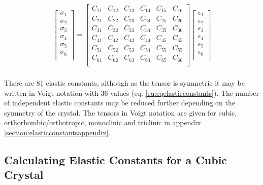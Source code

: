 \begin{equation}
  \begin{split}
    \begin{bmatrix}
      \sigma_{1} \\
      \sigma_{2} \\
      \sigma_{3} \\
      \sigma_{4} \\
      \sigma_{5} \\
      \sigma_{6} \\
      \end{bmatrix} = \begin{bmatrix}
      C_{11} & C_{12} & C_{13} & C_{14} & C_{15} & C_{16} \\
      C_{21} & C_{22} & C_{23} & C_{24} & C_{25} & C_{26} \\
      C_{31} & C_{32} & C_{33} & C_{34} & C_{35} & C_{36} \\
      C_{41} & C_{42} & C_{43} & C_{44} & C_{45} & C_{45} \\
      C_{51} & C_{52} & C_{53} & C_{54} & C_{55} & C_{55} \\
      C_{61} & C_{62} & C_{63} & C_{64} & C_{65} & C_{66} \\
      \end{bmatrix} \begin{bmatrix}
      \epsilon_{1} \\
      \epsilon_{2} \\
      \epsilon_{3} \\
      \epsilon_{4} \\
      \epsilon_{5} \\
      \epsilon_{6} \\
      \end{bmatrix}\\
    \end{split}
    \label{eq:eqelasticconstants}
\end{equation}

There are 81 elastic constants, although as the tensor is symmetric it may be written in Voigt notation with 36 values (eq. \ref{eq:eqelasticconstants}).  The number of independent elastic constants may be reduced further depending on the symmetry of the crystal.  The tensors in Voigt notation are given for cubic, orthorhombic/orthotropic, monoclinic and triclinic in appendix \ref{section:elasticconstantsappendix}.


\subsection{Calculating Elastic Constants for a Cubic Crystal}

